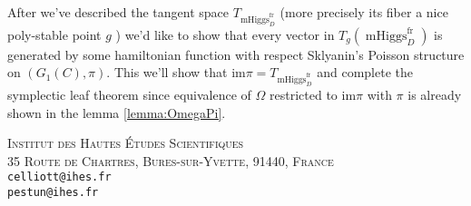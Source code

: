 \documentclass[11pt, oneside, reqno]{amsart}
\theoremstyle{definition} \newtheorem{definition}{Definition}[section]
\theoremstyle{definition} \newtheorem{remark}[definition]{Remark}
\theoremstyle{definition} \newtheorem{remarks}[definition]{Remarks}
\theoremstyle{definition} \newtheorem{question}[definition]{Question}
\theoremstyle{definition} \newtheorem*{note}{Note}
\theoremstyle{definition} \newtheorem{example}[definition]{Example}
\theoremstyle{definition} \newtheorem{examples}[definition]{Examples}
\DeclareMathOperator{\mhiggs}{mHiggs}
\newcommand{\fr}{\mathrm{fr}}
\begin{document}
After we've described the tangent space  $T_{\mhiggs_{D}^{\fr}}$ (more precisely its fiber
a nice poly-stable point $g$ )   we'd like to show that
every vector in $T_{g}(\mhiggs_{D}^{\fr})$ is generated by some hamiltonian function
with respect Sklyanin's Poisson structure on $(G_1(C), \pi)$.
This we'll show that $\mathrm{im} \pi = T_{\mhiggs_{D}^{\fr}}$
and complete the symplectic leaf theorem since equivalence of $\Omega$ restricted to
$\mathrm{im} \pi $ with $\pi$ is already shown in the lemma \ref{lemma:OmegaPi}. 


 
 








\textsc{Institut des Hautes \'Etudes Scientifiques}\\
\textsc{35 Route de Chartres, Bures-sur-Yvette, 91440, France}\\
\texttt{celliott@ihes.fr}\\ 
\texttt{pestun@ihes.fr}
 
\end{document}
